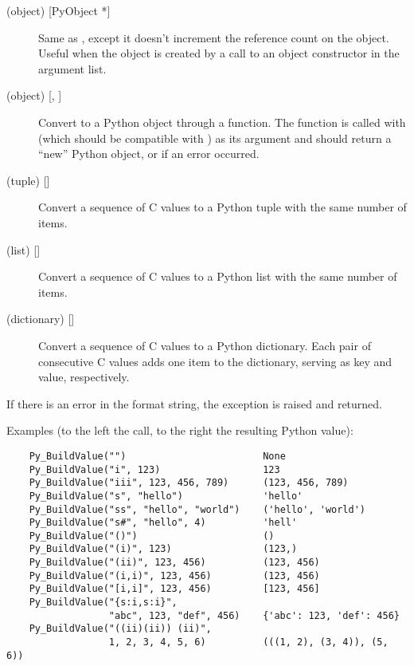 \documentclass{manual}
\begin{document}
\begin{description}
\item[ (object) {[PyObject *]}]
Same as , except it doesn't increment the reference count on
the object.  Useful when the object is created by a call to an object
constructor in the argument list.

\item[ (object) {[, ]}]
Convert  to a Python object through a 
function.  The function is called with  (which should be
compatible with ) as its argument and should return a
``new'' Python object, or \NULL{} if an error occurred.

\item[ (tuple) {[]}]
Convert a sequence of C values to a Python tuple with the same number
of items.

\item[ (list) {[]}]
Convert a sequence of C values to a Python list with the same number
of items.

\item[ (dictionary) {[]}]
Convert a sequence of C values to a Python dictionary.  Each pair of
consecutive C values adds one item to the dictionary, serving as key
and value, respectively.

\end{description}

If there is an error in the format string, the
 exception is raised and \NULL{} returned.

Examples (to the left the call, to the right the resulting Python value):

\begin{verbatim}
    Py_BuildValue("")                        None
    Py_BuildValue("i", 123)                  123
    Py_BuildValue("iii", 123, 456, 789)      (123, 456, 789)
    Py_BuildValue("s", "hello")              'hello'
    Py_BuildValue("ss", "hello", "world")    ('hello', 'world')
    Py_BuildValue("s#", "hello", 4)          'hell'
    Py_BuildValue("()")                      ()
    Py_BuildValue("(i)", 123)                (123,)
    Py_BuildValue("(ii)", 123, 456)          (123, 456)
    Py_BuildValue("(i,i)", 123, 456)         (123, 456)
    Py_BuildValue("[i,i]", 123, 456)         [123, 456]
    Py_BuildValue("{s:i,s:i}",
                  "abc", 123, "def", 456)    {'abc': 123, 'def': 456}
    Py_BuildValue("((ii)(ii)) (ii)",
                  1, 2, 3, 4, 5, 6)          (((1, 2), (3, 4)), (5, 6))
\end{verbatim}
\end{document}
